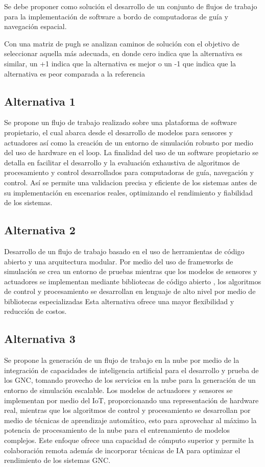 \documentclass[12pt]{article}
\begin{document}
Se debe proponer como solución el desarrollo de un conjunto de flujos de trabajo para la implementación de software a bordo de computadoras de guía y navegación espacial.

Con una matriz de pugh se analizan caminos de solución con el objetivo de seleccionar aquella más adecuada, en donde cero indica que la alternativa es similar, un +1 indica que la alternativa es mejor o un -1 que indica que la alternativa es peor comparada a la referencia


\subsection{Alternativa 1}

Se propone un flujo de trabajo realizado sobre una plataforma de software propietario, el cual abarca desde el desarrollo de modelos para sensores y actuadores así como la creación de un entorno de simulación robusto por medio del uso de hardware en el loop. La finalidad del uso de un software propietario se detalla en facilitar el desarrollo y la evaluación exhaustiva de algoritmos de procesamiento y control desarrollados para computadoras de guía, navegación y control. Así se permite una validacion precisa y eficiente de los sistemas antes de su implementación en escenarios reales, optimizando el rendimiento y fiabilidad de los sistemas.

\subsection{Alternativa 2}

Desarrollo de un flujo de trabajo basado en el uso de herramientas de código abierto y una arquitectura modular. Por medio del uso de frameworks de simulación se crea un entorno de pruebas mientras que los modelos de sensores y actuadores se implementan mediante bibliotecas de código abierto , los algoritmos de control y procesamiento se desarrollan en lenguaje de alto nivel por medio de bibliotecas especializadas Esta alternativa ofrece una mayor flexibilidad y reducción de costos.

\subsection{Alternativa 3}
Se propone la generación de un flujo de trabajo en la nube por medio de la integración de capacidades de inteligencia artificial para el desarrollo y prueba de los GNC, tomando provecho de los servicios en la nube para la generación de un entorno de simulación escalable. Los modelos de actuadores y sensores se implementan por medio del IoT, proporcionando una representación de hardware real, mientras que los algoritmos de control y procesamiento se desarrollan por medio de técnicas de aprendizaje automático, esto para aprovechar al máximo la potencia de procesamiento de la nube para el entrenamiento de modelos complejos. Este enfoque ofrece una capacidad de cómputo superior y permite la colaboración remota además de incorporar técnicas de IA para optimizar el rendimiento de los sistemas GNC.
\end{document}
